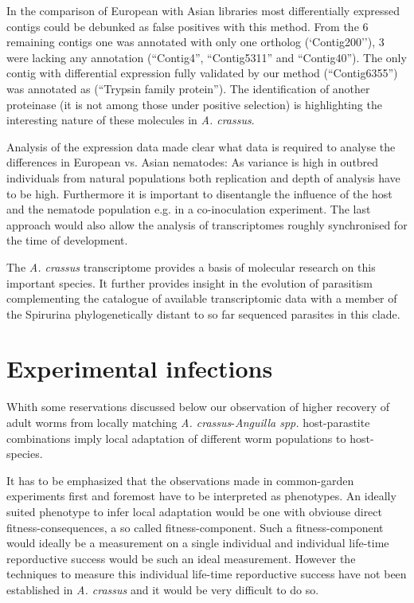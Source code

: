 In the comparison of European with Asian libraries most
differentially expressed contigs could be debunked as false positives
with this method. From the 6 remaining contigs one was annotated with
only one ortholog (`Contig200''), 3 were lacking any annotation
(``Contig4'', ``Contig5311'' and ``Contig40''). The only contig with
differential expression fully validated by our method (``Contig6355'')
was annotated as (``Trypsin family protein''). The identification of
another proteinase (it is not among those under positive selection) is
highlighting the interesting nature of these molecules in
\textit{A. crassus}.

Analysis of the expression data made clear what data is required to
analyse the differences in European vs. Asian nematodes: As variance
is high in outbred individuals from natural populations both
replication and depth of analysis have to be high. Furthermore it is
important to disentangle the influence of the host and the nematode
population e.g. in a co-inoculation experiment. The last approach
would also allow the analysis of transcriptomes roughly synchronised
for the time of development.

The \textit{A. crassus} transcriptome provides a basis of molecular
research on this important species. It further provides insight in
the evolution of parasitism complementing the catalogue of available
transcriptomic data with a member of the Spirurina phylogenetically
distant to so far sequenced parasites in this clade.

\section{Experimental infections}
\label{sec:exp-inf}

Whith some reservations discussed below our observation of higher
recovery of adult worms from locally matching
\textit{A. crassus}-\textit{Anguilla spp.} host-parastite combinations
imply local adaptation of different worm populations to host-species.

It has to be emphasized that the observations made in common-garden
experiments first and foremost have to be interpreted as
phenotypes. An ideally suited phenotype to infer local adaptation
would be one with obviouse direct fitness-consequences, a so called
fitness-component. Such a fitness-component would ideally be a
measurement on a single individual and individual life-time
reporductive success would be such an ideal measurement. However the
techniques to measure this individual life-time reporductive success
have not been established in \textit{A. crassus} and it would be very
difficult to do so.


